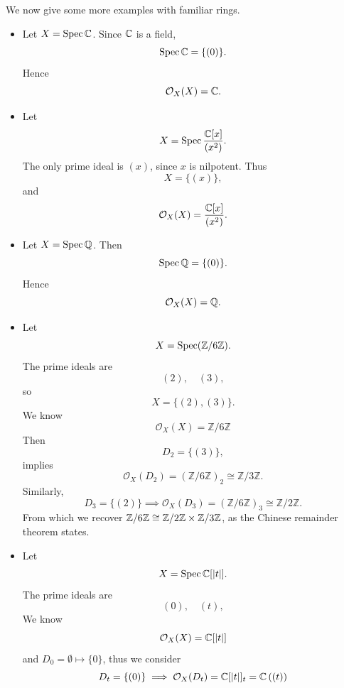 \begin{example}
We now give some more examples with familiar rings.
\begin{itemize}
    \item Let \(X = \operatorname{Spec}\mathbb{C}\). Since \(\mathbb{C}\) is a field,
    \[
        \operatorname{Spec}\mathbb{C}
        =
        \{(0)\}.
    \]
    Hence
    \[
        \mathcal{O}_X(X)
        =
        \mathbb{C}.
    \]
    \item Let
    \[
        X
        =
        \operatorname{Spec}\frac{\mathbb{C}[x]}{(x^2)}.
    \]
    The only prime ideal is \((x)\), since \(x\) is nilpotent. Thus
    \[
        X = \{(x)\},
    \]
    and
    \[
        \mathcal{O}_X(X)
        =
        \frac{\mathbb{C}[x]}{(x^2)}.
    \]
 \item Let \(X = \operatorname{Spec}\mathbb{Q}\). Then
    \[
        \operatorname{Spec}\mathbb{Q}
        =
        \{(0)\}.
    \]
    Hence
    \[
        \mathcal{O}_X(X)
        =
        \mathbb{Q}.
    \]
    \item Let
    \[
        X = \operatorname{Spec}(\mathbb{Z}/6\mathbb{Z}).
    \]
    The prime ideals are
    \[
        (2),\quad (3),
    \]
    so
    \[
        X = \{(2),(3)\}.
    \]
    We know
    \[
    \mathcal{O}_X(X) = \mathbb{Z}/6\mathbb{Z}
    \]
   Then
    \[
        D_2
        =
        \{(3)\},
    \]
    implies
    \[
        \mathcal{O}_X(D_2)
        =
        (\mathbb{Z}/6\mathbb{Z})_2
        \cong
        \mathbb{Z}/3\mathbb{Z}.
    \]
    Similarly,
    \[
        D_3 = \{(2)\} \implies \mathcal{O}_X(D_3) = (\mathbb{Z}/6\mathbb{Z})_3 \cong \mathbb{Z}/2\mathbb{Z}.
    \]
From which we recover $\mathbb{Z}/6\mathbb{Z} \cong \mathbb{Z}/2\mathbb{Z}\times \mathbb{Z}/3\mathbb{Z}$, as the Chinese remainder theorem states.
    \item Let
    \[
        X = \operatorname{Spec}\mathbb{C}[|t|].
    \]
    The prime ideals are
    \[
        (0),\quad(t),
    \]
    We know
    \[
     \mathcal{O}_X(X) = \mathbb{C}[|t|]
    \]
    and $D_0 = \emptyset\mapsto \{0\}$, thus we consider
    \[
    D_t = \{(0)\} \implies \mathcal{O}_X(D_t) = \mathbb{C}[|t|]_t = \mathbb{C}\left((t)\right)
    \]
\end{itemize}
\end{example}

